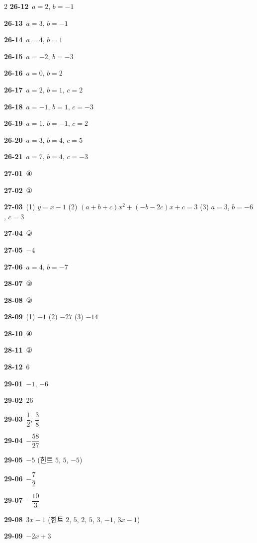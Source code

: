 \documentclass[10pt,a4paper]{article}
\begin{document}
\begin{multicols}{2}
\noindent\textbf{26-12}\ $a=2$, $b=-1$\par
\noindent\textbf{26-13}\ $a=3$, $b=-1$\par
\noindent\textbf{26-14}\ $a=4$, $b=1$\par
\noindent\textbf{26-15}\ $a=-2$, $b=-3$\par
\noindent\textbf{26-16}\ $a=0$, $b=2$\par
\noindent\textbf{26-17}\ $a=2$, $b=1$, $c=2$\par
\noindent\textbf{26-18}\ $a=-1$, $b=1$, $c=-3$\par
\noindent\textbf{26-19}\ $a=1$, $b=-1$, $c=2$\par
\noindent\textbf{26-20}\ $a=3$, $b=4$, $c=5$\par
\noindent\textbf{26-21}\ $a=7$, $b=4$, $c=-3$\par
\noindent\textbf{27-01}\ ④\par
\noindent\textbf{27-02}\ ①\par
\noindent\textbf{27-03}\ (1) $y=x-1$ (2) $(a+b+c)x^2+(-b-2c)x+c=3$ (3) $a=3$, $b=-6$, $c=3$\par
\noindent\textbf{27-04}\ ③\par
\noindent\textbf{27-05}\ $-4$\par
\noindent\textbf{27-06}\ $a=4$, $b=-7$\par
\noindent\textbf{28-07}\ ③\par
\noindent\textbf{28-08}\ ③\par
\noindent\textbf{28-09}\ (1) $-1$ (2) $-27$ (3) $-14$\par
\noindent\textbf{28-10}\ ④\par
\noindent\textbf{28-11}\ ②\par
\noindent\textbf{28-12}\ 6\par
\noindent\textbf{29-01}\ $-1$, $-6$\par
\noindent\textbf{29-02}\ 26\par
\noindent\textbf{29-03}\ $\dfrac{1}{2}$, $\dfrac{3}{8}$\par
\noindent\textbf{29-04}\ $-\dfrac{58}{27}$\par
\noindent\textbf{29-05}\ $-5$ (힌트 $5$, $5$, $-5$)\par
\noindent\textbf{29-06}\ $-\dfrac{7}{2}$\par
\noindent\textbf{29-07}\ $-\dfrac{10}{3}$\par
\noindent\textbf{29-08}\ $3x-1$ (힌트 $2$, $5$, $2$, $5$, $3$, $-1$, $3x-1$)\par
\noindent\textbf{29-09}\ $-2x+3$\par

\end{multicols}
\end{document}
